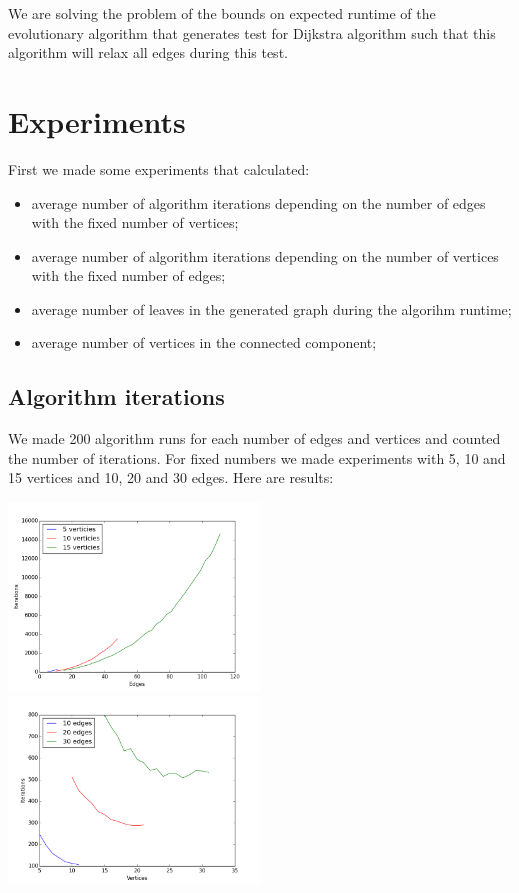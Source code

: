 \documentclass{llncs}
\begin{document}
 We are solving the problem of the bounds on expected runtime of the evolutionary algorithm that generates test for Dijkstra algorithm such that this algorithm will relax all edges during this test.
 
 \section{Experiments}
 
 First we made some experiments that calculated:
 \begin{itemize}
  \item average number of algorithm iterations depending on the number of edges with the fixed number of vertices;
  \item average number of algorithm iterations depending on the number of vertices with the fixed number of edges;
  \item average number of leaves in the generated graph during the algorihm runtime;
  \item average number of vertices in the connected component;
 \end{itemize}
 
 \subsection{Algorithm iterations}
  We made 200 algorithm runs for each number of edges and vertices and counted the number of iterations. For fixed numbers we made experiments with 5, 10 and 15 vertices and 10, 20 and 30 edges. Here are results:
  
  \includegraphics[height=5cm]{pic/const_vertices.png}
  \includegraphics[height=5cm]{pic/const_edges.png}
  
\end{document}
